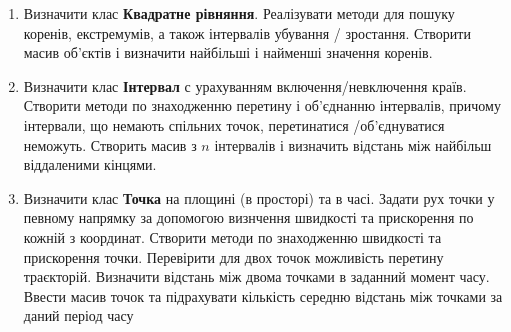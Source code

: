 \documentclass[]{article}
\begin{document}
\begin{enumerate}
\item
  Визначити клас \textbf{Квадратне рівняння}. Реалізувати методи для
  пошуку коренів, екстремумів, а також інтервалів убування / зростання.
  Створити масив об'єктів і визначити найбільші і найменші значення
  коренів.
\item
  Визначити клас \textbf{Інтервал} с урахуванням включення/невключення
  країв. Створити методи по знаходженню перетину і об'єднанню
  інтервалів, причому інтервали, що немають спільних точок, перетинатися
  /об'єднуватися неможуть. Створить масив з \(n\) інтервалів і визначить
  відстань між найбільш віддаленими кінцями.
\item
  Визначити клас \textbf{Точка} на площині (в просторі) та в часі.
  Задати рух точки у певному напрямку за допомогою визнчення швидкості
  та прискорення по кожній з координат. Створити методи по знаходженню
  швидкості та прискорення точки. Перевірити для двох точок можливість
  перетину траєкторій. Визначити відстань між двома точками в заданний
  момент часу. Ввести масив точок та підрахувати кількість середню
  відстань між точками за даний період часу
\end{enumerate}
\end{document}
